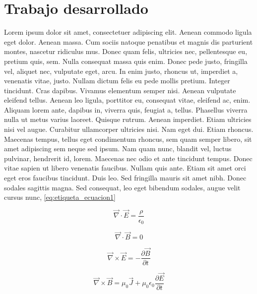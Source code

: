 \chapter{Trabajo desarrollado}

Lorem ipsum dolor sit amet, consectetuer adipiscing elit. Aenean commodo ligula eget dolor. Aenean massa. Cum sociis natoque penatibus et magnis dis parturient montes, nascetur ridiculus mus. Donec quam felis, ultricies nec, pellentesque eu, pretium quis, sem. Nulla consequat massa quis enim. Donec pede justo, fringilla vel, aliquet nec, vulputate eget, arcu. In enim justo, rhoncus ut, imperdiet a, venenatis vitae, justo. Nullam dictum felis eu pede mollis pretium. Integer tincidunt. Cras dapibus. Vivamus elementum semper nisi. Aenean vulputate eleifend tellus. Aenean leo ligula, porttitor eu, consequat vitae, eleifend ac, enim. Aliquam lorem ante, dapibus in, viverra quis, feugiat a, tellus. Phasellus viverra nulla ut metus varius laoreet. Quisque rutrum. Aenean imperdiet. Etiam ultricies nisi vel augue. Curabitur ullamcorper ultricies nisi. Nam eget dui. Etiam rhoncus. Maecenas tempus, tellus eget condimentum rhoncus, sem quam semper libero, sit amet adipiscing sem neque sed ipsum. Nam quam nunc, blandit vel, luctus pulvinar, hendrerit id, lorem. Maecenas nec odio et ante tincidunt tempus. Donec vitae sapien ut libero venenatis faucibus. Nullam quis ante. Etiam sit amet orci eget eros faucibus tincidunt. Duis leo. Sed fringilla mauris sit amet nibh. Donec sodales sagittis magna. Sed consequat, leo eget bibendum sodales, augue velit cursus nunc,
\ref{eq:etiqueta_ecuacion1}

\begin{equation} \label{eq:etiqueta_ecuacion1}
	\vec{\nabla}\cdot \vec{E}= \dfrac{\rho}
{\epsilon_0}
\end{equation}

\begin{equation} \label{eq:etiqueta_ecuacion2}
	\vec{\nabla}\cdot \vec{B}= 0
\end{equation}

\begin{equation} \label{eq:etiqueta_ecuacion3}
\vec{\nabla}\times\vec{E}=-\dfrac{\partial 
\vec{B}}{\partial t}
\end{equation}

\begin{equation} \label{eq:etiqueta_ecuacion4}
\vec{\nabla}\times \vec{B}=\mu_0\vec{J}+\mu_0
\epsilon_0 \dfrac{\partial \vec{E}}
{\partial t}
\end{equation}


